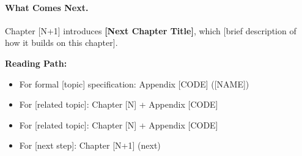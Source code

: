 \paragraph{What Comes Next.}
Chapter [N+1] introduces \textbf{[Next Chapter Title]}, which [brief description
of how it builds on this chapter].

\begin{cross-reference}
\textbf{Reading Path:}
\begin{itemize}
    \item For formal [topic] specification: Appendix [CODE] ([NAME])
    \item For [related topic]: Chapter [N] + Appendix [CODE]
    \item For [related topic]: Chapter [N] + Appendix [CODE]
    \item For [next step]: Chapter [N+1] (next)
\end{itemize}
\end{cross-reference}



%
%


%


%


